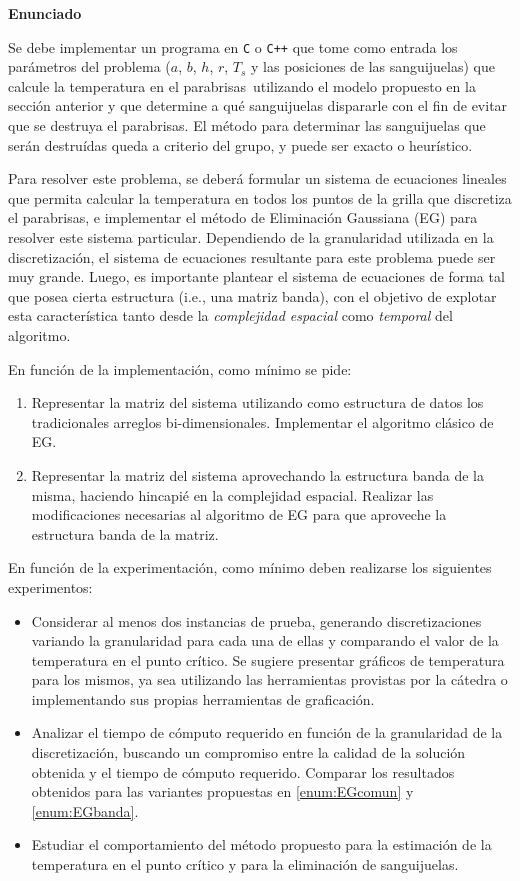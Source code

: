 \documentclass[double, 1.5in, 12pt]{beavtex}
\newcommand{\atacante}{sanguijuela}
\newcommand{\objeto}{parabrisas}
\begin{document}
{\noindent \bf Enunciado}

Se debe implementar un programa en \verb+C+ o \verb-C++- que tome como entrada los par\'ametros del problema ($a$, $b$, $h$, $r$, $T_s$ y las posiciones de las \atacante s) que calcule la temperatura en el \objeto\ utilizando el modelo propuesto en la secci\'on anterior y que determine a qu\'e \atacante s dispararle con el fin de evitar que se destruya el \objeto. El m\'etodo para determinar las \atacante s que ser\'an destru\'idas queda a criterio del grupo, y puede ser exacto o heur\'istico.

Para resolver este problema, se deber\'a formular un sistema de ecuaciones lineales que permita calcular la temperatura en todos los puntos de la grilla que discretiza el \objeto, e implementar el m\'etodo de Eliminaci\'on Gaussiana (EG) para resolver este sistema particular. Dependiendo de la granularidad utilizada en la discretizaci\'on, el sistema de ecuaciones resultante para este problema puede ser muy grande. Luego, es importante plantear el sistema de ecuaciones de forma tal que posea cierta estructura (i.e., una matriz banda), con el objetivo de explotar esta caracter\'istica tanto desde la \emph{complejidad espacial} como \emph{temporal} del algoritmo.

En funci\'on de la implementaci\'on, como m\'inimo se pide:
\begin{enumerate}
\item Representar la matriz del sistema utilizando como estructura de datos los tradicionales arreglos bi-dimensionales. Implementar el algoritmo cl\'asico de EG. \label{enum:EGcomun}
\item Representar la matriz del sistema aprovechando la estructura banda de la misma, haciendo hincapi\'e en la complejidad espacial.  Realizar las modificaciones necesarias al algoritmo de EG para que aproveche la estructura banda de la matriz. \label{enum:EGbanda}
\end{enumerate}

En funci\'on de la experimentaci\'on, como m\'inimo deben realizarse los siguientes experimentos:

\begin{itemize}
\item Considerar al menos dos instancias de prueba, generando discretizaciones variando la granularidad para cada una de ellas y comparando el valor de la temperatura en el punto cr\'itico. Se sugiere presentar gr\'aficos de temperatura para los mismos, ya sea utilizando las herramientas provistas por la c\'atedra o implementando sus propias herramientas de graficaci\'on. 
\item Analizar el tiempo de c\'omputo requerido en funci\'on de la granularidad de la discretizaci\'on, buscando un compromiso entre la calidad de la soluci\'on obtenida y el tiempo de c\'omputo requerido. Comparar los resultados obtenidos para las variantes propuestas en \ref{enum:EGcomun} y \ref{enum:EGbanda}. 
\item Estudiar el comportamiento del m\'etodo propuesto para la estimaci\'on de la temperatura en el punto cr\'itico y para la eliminaci\'on de \atacante s.
\end{itemize}
\end{document}
